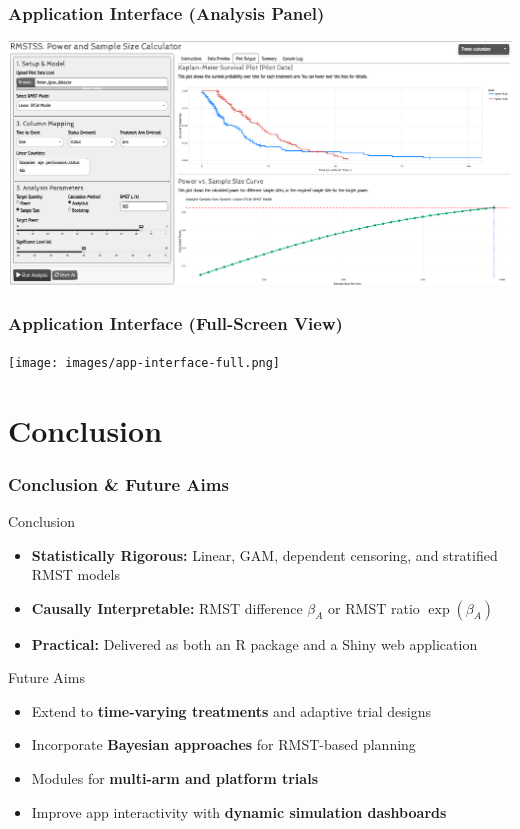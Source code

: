 \documentclass{beamer}
\begin{document}
\begin{frame}
\frametitle{Application Interface (Analysis Panel)}
\includegraphics[width=\textwidth]{images/app-ss.png}
\end{frame}

\begin{frame}
\frametitle{Application Interface (Full-Screen View)}
\texttt{[image: images/app-interface-full.png]}
\end{frame}

\section{Conclusion}
\begin{frame}
\frametitle{Conclusion \& Future Aims}

\begin{block}{Conclusion}
\begin{itemize}
  \item \textbf{Statistically Rigorous:} Linear, GAM, dependent censoring, and stratified RMST models
  \item \textbf{Causally Interpretable:} RMST difference $\beta_A$ or RMST ratio $\exp(\beta_A)$
  \item \textbf{Practical:} Delivered as both an R package and a Shiny web application
\end{itemize}
\end{block}

\begin{block}{Future Aims}
\begin{itemize}
  \item Extend to \textbf{time-varying treatments} and adaptive trial designs
  \item Incorporate \textbf{Bayesian approaches} for RMST-based planning
  \item Modules for \textbf{multi-arm and platform trials}
  \item Improve app interactivity with \textbf{dynamic simulation dashboards}
\end{itemize}
\end{block}
\end{frame}
\end{document}
